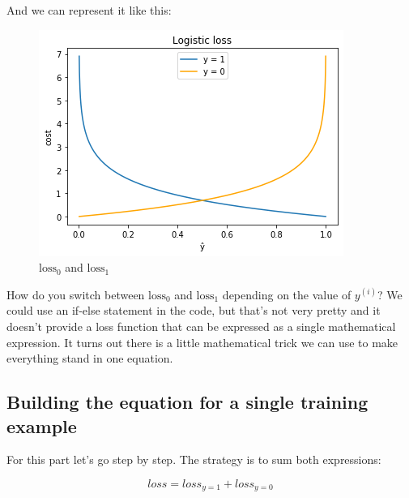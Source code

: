 And we can represent it like this:
\begin{figure}[!h]
    \centering
    \includegraphics[scale=0.55]{assets/log_loss.png}
    \caption{$\text{loss}_0$ and $\text{loss}_1$}
\end{figure}

How do you switch between $\text{loss}_0$ and $\text{loss}_1$ depending on the value of $y^{(i)}$?
We could use an if-else statement in the code, but that's not very pretty and it doesn't provide a loss function that can be expressed as a single mathematical expression.
It turns out there is a little mathematical trick we can use to make everything stand in one equation.

\newpage
\subsection*{Building the equation for a single training example}
For this part let's go step by step.
The strategy is to sum both expressions:

$$
loss = loss_{y=1} + loss_{y=0}
$$

